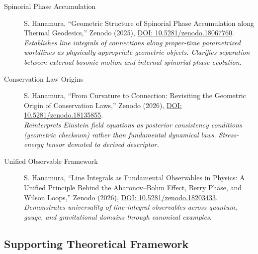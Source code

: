 \documentclass[12pt,letterpaper]{article}
\begin{document}
\begin{description}
\item[Spinorial Phase Accumulation] S. Hanamura, ``Geometric Structure of Spinorial Phase Accumulation along Thermal Geodesics,'' Zenodo (2025), \href{https://doi.org/10.5281/zenodo.18067760}{DOI: 10.5281/zenodo.18067760}. \\
\textit{Establishes line integrals of connections along proper-time parametrized worldlines as physically appropriate geometric objects. Clarifies separation between external bosonic motion and internal spinorial phase evolution.}

\item[Conservation Law Origins] S. Hanamura, ``From Curvature to Connection: Revisiting the Geometric Origin of Conservation Laws,'' Zenodo (2026), \href{https://doi.org/10.5281/zenodo.18135855}{DOI: 10.5281/zenodo.18135855}. \\
\textit{Reinterprets Einstein field equations as posterior consistency conditions (geometric checksum) rather than fundamental dynamical laws. Stress-energy tensor demoted to derived descriptor.}

\item[Unified Observable Framework] S. Hanamura, ``Line Integrals as Fundamental Observables in Physics: A Unified Principle Behind the Aharonov--Bohm Effect, Berry Phase, and Wilson Loops,'' Zenodo (2026), \href{https://doi.org/10.5281/zenodo.18203433}{DOI: 10.5281/zenodo.18203433}. \\
\textit{Demonstrates universality of line-integral observables across quantum, gauge, and gravitational domains through canonical examples.}
\end{description}

\subsection*{Supporting Theoretical Framework}
\end{document}
